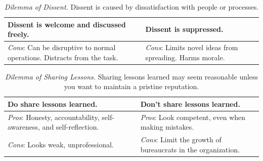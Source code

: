 

\begin{center}
\begin{table}[H] %
\begin{tabular}{ | m{\dilemmatablewidth}| m{\dilemmatablewidth} | } 
  \hline
  \textbf{Dissent is welcome and discussed freely.} & 
  \textbf{Dissent is suppressed.} \\ 
  \hline
  \textit{Cons}: Can be disruptive to normal operations. Distracts from the task. & 
  \textit{Cons}: Limits novel ideas from spreading. Harms morale. \\  
  \hline
\end{tabular}
\caption{
\textit{Dilemma of Dissent.}
Dissent is caused by dissatisfaction with people or processes. 
}
\label{table:dilemma-how-dissent-is-responded-to}
\end{table}
\end{center}



\begin{center}
\begin{table}[H] %
\begin{tabular}{ | m{\dilemmatablewidth}| m{\dilemmatablewidth} | } 
  \hline
  \textbf{Do share lessons learned.} & 
  \textbf{Don't share lessons learned.} \\ 
  \hline
  \textit{Pros}: Honesty, accountability, self-awareness, and self-reflection. & 
  \textit{Pros}: Look competent, even when making mistakes. \\  
  \hline
  \textit{Cons}: Looks weak, unprofessional. & 
  \textit{Cons}: Limit the growth of bureaucrats in the organization. \\  
  \hline
\end{tabular}
\caption{
\textit{Dilemma of Sharing Lessons.}
Sharing lessons learned may seem reasonable unless you want to maintain a pristine reputation. 
}
\label{table:dilemma-sharing-lessons-learned}
\end{table}
\end{center}

